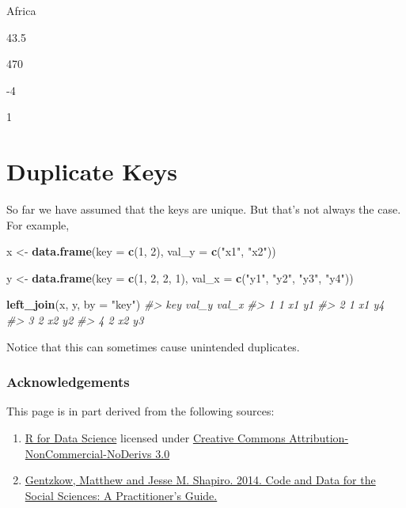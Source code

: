 \documentclass[]{book}
\newenvironment{Shaded}{\begin{snugshade}}{\end{snugshade}}
\newcommand{\KeywordTok}[1]{\textcolor[rgb]{0.13,0.29,0.53}{\textbf{#1}}}
\newcommand{\DataTypeTok}[1]{\textcolor[rgb]{0.13,0.29,0.53}{#1}}
\newcommand{\DecValTok}[1]{\textcolor[rgb]{0.00,0.00,0.81}{#1}}
\newcommand{\StringTok}[1]{\textcolor[rgb]{0.31,0.60,0.02}{#1}}
\newcommand{\CommentTok}[1]{\textcolor[rgb]{0.56,0.35,0.01}{\textit{#1}}}
\newcommand{\NormalTok}[1]{#1}
\begin{document}
Africa

43.5

470

-4

1

\section{Duplicate Keys}\label{duplicate-keys}

So far we have assumed that the keys are unique. But that's not always
the case. For example,

\begin{Shaded}
\begin{Highlighting}[]
\NormalTok{x <-}\StringTok{ }\KeywordTok{data.frame}\NormalTok{(}\DataTypeTok{key =} \KeywordTok{c}\NormalTok{(}\DecValTok{1}\NormalTok{, }\DecValTok{2}\NormalTok{),}
               \DataTypeTok{val_y =} \KeywordTok{c}\NormalTok{(}\StringTok{"x1"}\NormalTok{, }\StringTok{"x2"}\NormalTok{))}

\NormalTok{y <-}\StringTok{ }\KeywordTok{data.frame}\NormalTok{(}\DataTypeTok{key =} \KeywordTok{c}\NormalTok{(}\DecValTok{1}\NormalTok{, }\DecValTok{2}\NormalTok{, }\DecValTok{2}\NormalTok{, }\DecValTok{1}\NormalTok{),}
               \DataTypeTok{val_x =} \KeywordTok{c}\NormalTok{(}\StringTok{"y1"}\NormalTok{, }\StringTok{"y2"}\NormalTok{, }\StringTok{"y3"}\NormalTok{, }\StringTok{"y4"}\NormalTok{))}

\KeywordTok{left_join}\NormalTok{(x, y, }\DataTypeTok{by =} \StringTok{"key"}\NormalTok{)}
\CommentTok{#>   key val_y val_x}
\CommentTok{#> 1   1    x1    y1}
\CommentTok{#> 2   1    x1    y4}
\CommentTok{#> 3   2    x2    y2}
\CommentTok{#> 4   2    x2    y3}
\end{Highlighting}
\end{Shaded}

Notice that this can sometimes cause unintended duplicates.

\subsubsection*{Acknowledgements}\label{acknowledgements-2}

This page is in part derived from the following sources:

\begin{enumerate}
\def\labelenumi{\arabic{enumi}.}
\item
  \href{https://r4ds.had.co.nz}{R for Data Science} licensed under
  \href{https://creativecommons.org/licenses/by-nc-nd/3.0/us/}{Creative
  Commons Attribution-NonCommercial-NoDerivs 3.0}
\item
  \href{https://web.stanford.edu/~gentzkow/research/CodeAndData.pdf}{Gentzkow,
  Matthew and Jesse M. Shapiro. 2014. Code and Data for the Social
  Sciences: A Practitioner's Guide.}
\end{enumerate}
\end{document}
